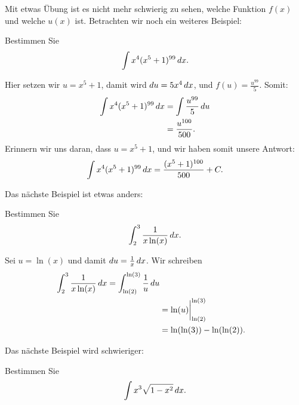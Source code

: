 Mit etwas Übung ist es nicht mehr schwierig zu sehen, welche Funktion $f(x)$ und welche $u(x)$ ist. Betrachten wir noch ein weiteres Beispiel:
\begin{example}
Bestimmen Sie
\[
\int x^4(x^5+1)^{99} \, d x.
\]
\end{example}

\begin{solution}
Hier setzen wir $u = x^5+1$, damit wird $du = 5x^4 \, d x$, und $f(u) = \frac{u^{99}}{5}$. Somit:
\begin{align*}
\int x^4(x^5+1)^{99} \, d x &= \int \frac{u^{99}}{5} \, d u\\
&= \frac{u^{100}}{500}.
\end{align*}
Erinnern wir uns daran, dass $u = x^5+1$, und wir haben somit unsere Antwort:
\[
\int x^4(x^5+1)^{99} \, d x= \frac{(x^5+1)^{100}}{500}+C.
\]
\end{solution}


Das nächste Beispiel ist etwas anders:

\begin{example}
Bestimmen Sie
\[
\int_{2}^{3} \frac{1}{x\ln(x)} \, d x.
\]
\end{example}

\begin{solution}
Sei $u=\ln(x)$ und damit $du=\frac{1}{x}\, d x$. Wir schreiben
\begin{align*}
\int_{2}^{3} \frac{1}{x\ln(x)} \, d x = \int_{\ln(2)}^{\ln(3)} \frac{1}{u} \, d u\\
&= \ln(u) \bigg|_{\ln(2)}^{\ln(3)}\\
& = \ln(\ln(3)) - \ln(\ln(2)).
\end{align*}
\end{solution}


Das nächste Beispiel wird schwieriger:

\begin{example} Bestimmen Sie
\[
\int x^3\sqrt{1-x^2}\, d x.
\]
\end{example}

